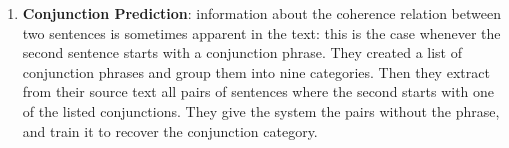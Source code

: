 \begin{itemize}
\begin{enumerate}
\item \textbf{Conjunction Prediction}: information about the coherence relation between two sentences is sometimes apparent in the text: this is the case whenever the second sentence starts with a conjunction phrase. They created a list of conjunction phrases and group them into nine categories. Then they extract from their source text all pairs of sentences where the second starts with one of the
listed conjunctions. They give the system the pairs without the phrase, and train it to recover the conjunction category.
\end{enumerate}



\end{itemize}


